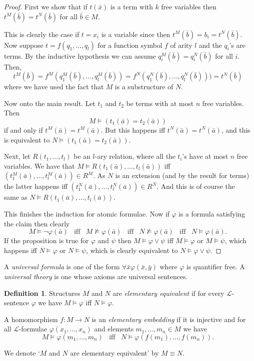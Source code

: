 \documentclass{report}
\theoremstyle{definition}
\theoremstyle{plain}
\theoremstyle{definition}
\newtheorem{defn}[thm]{Definition}
\begin{document}
	\begin{proof}
		First we show that if $t(\bar{x})$ is a term with $k$ free variables then $t^M(\bar{b}) = t^N(\bar{b})$ for all $\bar{b}\in M$.
		
		This is clearly the case if $t = x_i$ is a variable since then $t^M(\bar{b}) = b_i = t^N(\bar{b})$. Now suppose $t = f(q_1,\ldots, q_l)$ for a function symbol $f$ of arity $l$ and the $q_i$'s are terms. By the inductive hypothesis we can assume $q_i^M(\bar{b}) = q_i^N(\bar{b})$ for all $i$. Then,
		\[
			t^M(\bar{b}) = f^M(q_1^M(\bar{b}),\ldots, q_l^M(\bar{b})) = f^N(q_1^N(\bar{b}), \ldots, q_l^N(\bar{b}))) = t^N(\bar{b})
		\]
		where we have used the fact that $M$ is a substructure of $N$.
		
		Now onto the main result. Let $t_1$ and $t_2$ be terms with at most $n$ free variables. Then
		\[
			M\models (t_1(\bar{a}) = t_2(\bar{a}))
		\] 
		if and only if $t^{M}(\bar{a}) = t^M(\bar{a})$. But this happens iff $t^{N}(\bar{a}) = t^N(\bar{a})$, and this is equivalent to $N \models (t_1(\bar{a}) = t_2(\bar{a}))$.
		
		Next, let $R(t_1,\ldots,t_l)$ be an $l$-ary relation, where all the $t_i$'s have at most $n$ free variables. We have that $M\models R(t_1(\bar{a}),\ldots,t_l(\bar{a}))$ iff $(t_1^M(\bar{a}),\ldots,t_l^M(\bar{a}))\in R^M$. As $N$ is an extension (and by the result for terms) the latter happens iff $(t_1^N(\bar{a}),\ldots, t_l^N(\bar{a}))\in R^N$. And this is of course the same as $N \models R(t_1(\bar{a}),\ldots,t_l(\bar{a}))$.
		
		This finishes the induction for atomic formulae. Now if $\varphi$ is a formula satisfying the claim then clearly 
		\[
			M\models \neg \varphi(\bar{a})\,\,\, \text{ iff }\,\,\, M \nvDash \varphi(\bar{a}) \,\,\,\text{ iff }\,\,\, N \nvDash\varphi(\bar{a})\,\,\, \text{ iff }\,\,\, N \models \varphi(\bar{a}). 
		\]
		If the proposition is true for $\varphi$ and $\psi$ then $M \models \varphi \vee \psi$ iff $M \models \varphi$ or $M\models \psi$, which happens iff $N \models \varphi$ or $N \models \psi$, which is clearly equivalent to $N \models \varphi \vee \psi$.
	\end{proof}
	A \emph{universal formula} is one of the form $\forall \bar{x} \varphi(\bar{x},\bar{y})$ where $\varphi$ is quantifier free. A \emph{universal theory} is one whose axioms are universal sentences.
	\begin{defn}
		Structures $M$ and $N$ are \emph{elementary equivalent} if for every $\mathcal{L}$-sentence $\varphi$ we have $M\models \varphi$ iff $N\models \varphi$. 
		
		A homomorphism $f\colon M \to N$ is an \emph{elementary embedding} if it is injective and for all $\mathcal{L}$-formulae $\varphi(x_1,\ldots,x_n)$ and elements $m_1,\ldots,m_n\in M$ we have 
		\[
			M \models \varphi(m_1,\ldots,m_n) \,\,\,\text{ iff }\,\,\, N \models \varphi(f(m_1),\ldots, f(m_n)).
		\] 
		
		We denote `$M$ and $N$ are elementary equivalent' by $M \equiv N$.
	\end{defn}
\end{document}
